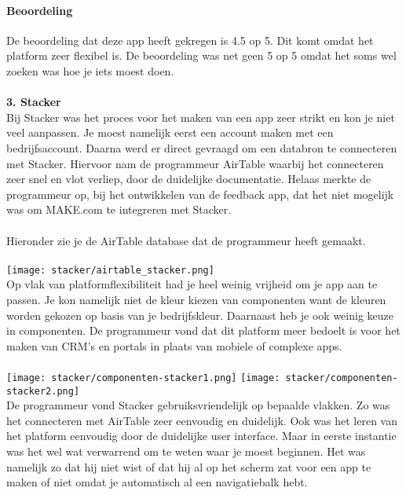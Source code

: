 \paragraph*{Beoordeling}
De beoordeling dat deze app heeft gekregen is 4.5 op 5. Dit komt omdat het platform zeer flexibel is. 
De beoordeling was net geen 5 op 5 omdat het soms wel zoeken was hoe je iets moest doen.
\\
\\
\textbf{3. Stacker}
\\
Bij Stacker was het proces voor het maken van een app zeer strikt en kon je niet veel aanpassen. Je moest namelijk eerst een account maken met een bedrijfsaccount.
Daarna werd er direct gevraagd om een databron te connecteren met Stacker. Hiervoor nam de programmeur AirTable waarbij het connecteren zeer snel en vlot verliep, door de duidelijke documentatie.
Helaas merkte de programmeur op, bij het ontwikkelen van de feedback app, dat het niet mogelijk was om MAKE.com te integreren met Stacker.
\\
\\
Hieronder zie je de AirTable database dat de programmeur heeft gemaakt.
\\
\\
\texttt{[image: stacker/airtable\_stacker.png]}
\\
Op vlak van platformflexibiliteit had je heel weinig vrijheid om je app aan te passen. Je kon namelijk niet de kleur kiezen van componenten want de kleuren worden gekozen
op basis van je bedrijfskleur. Daarnaast heb je ook weinig keuze in componenten. De programmeur vond dat dit platform meer bedoelt is voor het maken van CRM's en portals in plaats van 
mobiele of complexe apps.
\\
\\
\texttt{[image: stacker/componenten-stacker1.png]}
\texttt{[image: stacker/componenten-stacker2.png]}
\\
De programmeur vond Stacker gebruiksvriendelijk op bepaalde vlakken. Zo was het connecteren met AirTable zeer eenvoudig en duidelijk.
Ook was het leren van het platform eenvoudig door de duidelijke user interface. Maar in eerste instantie was het wel wat verwarrend om te weten waar je moest beginnen.
Het was namelijk zo dat hij niet wist of dat hij al op het scherm zat voor een app te maken of niet omdat je automatisch al een navigatiebalk hebt.
\\
\\
